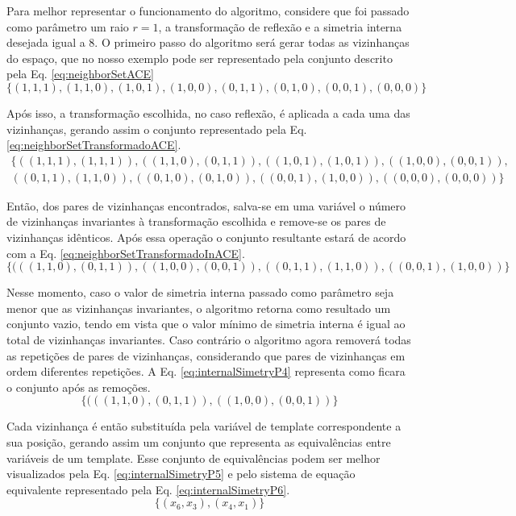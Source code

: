 Para melhor representar o funcionamento do algoritmo, considere que foi passado como parâmetro um raio $r = 1$, a transformação de reflexão e a simetria interna desejada igual a 8. O primeiro passo do algoritmo será gerar todas as vizinhanças do espaço, que no nosso exemplo pode ser representado pela conjunto descrito pela Eq. \eqref{eq:neighborSetACE}
\begin{equation}
\{(1,1,1),(1,1,0),
(1,0,1),(1,0,0),
(0,1,1),(0,1,0),
(0,0,1),(0,0,0)\}
\label{eq:neighborSetACE}
\end{equation}

Após isso, a transformação escolhida, no caso reflexão, é aplicada a cada uma das vizinhanças, gerando assim o conjunto representado pela Eq. \eqref{eq:neighborSetTransformadoACE}.  
\begin{equation}
\begin{split}
\{
((1,1,1),(1,1,1)),
((1,1,0),(0,1,1)),
((1,0,1),(1,0,1)),
((1,0,0),(0,0,1)),\\
((0,1,1),(1,1,0)),
((0,1,0),(0,1,0)),
((0,0,1),(1,0,0)),
((0,0,0),(0,0,0))\}
\label{eq:neighborSetTransformadoACE}
\end{split}
\end{equation}

Então, dos pares de vizinhanças encontrados, salva-se em uma variável o número de vizinhanças invariantes à transformação escolhida e remove-se os pares de vizinhanças idênticos. Após essa operação o conjunto resultante estará de acordo com a Eq. \eqref{eq:neighborSetTransformadoInACE}.
\begin{equation}
\{(((1,1,0),(0,1,1)),
((1,0,0),(0,0,1)),
((0,1,1),(1,1,0)),
((0,0,1),(1,0,0))\}
\label{eq:neighborSetTransformadoInACE}
\end{equation}

Nesse momento, caso o valor de simetria interna passado como parâmetro seja menor que as vizinhanças invariantes, o algoritmo retorna como resultado um conjunto vazio, tendo em vista que o valor mínimo de simetria interna é igual ao total de vizinhanças invariantes. Caso contrário o algoritmo agora removerá todas as repetições de pares de vizinhanças, considerando que pares de vizinhanças em ordem diferentes repetições. A Eq. \eqref{eq:internalSimetryP4} representa como ficara o conjunto após as remoções.
\begin{equation}
\{(((1,1,0),(0,1,1)), ((1,0,0),(0,0,1))\}
\label{eq:internalSimetryP4}
\end{equation}

Cada vizinhança é então substituída pela variável de template correspondente a sua posição, gerando assim um conjunto que representa as equivalências entre variáveis de um template. Esse conjunto de equivalências podem ser melhor visualizados pela Eq. \eqref{eq:internalSimetryP5} e pelo sistema de equação equivalente representado pela Eq. \eqref{eq:internalSimetryP6}.
\begin{equation}
\{(x_6,x_3), (x_4,x_1)\}
\label{eq:internalSimetryP5}
\end{equation}

